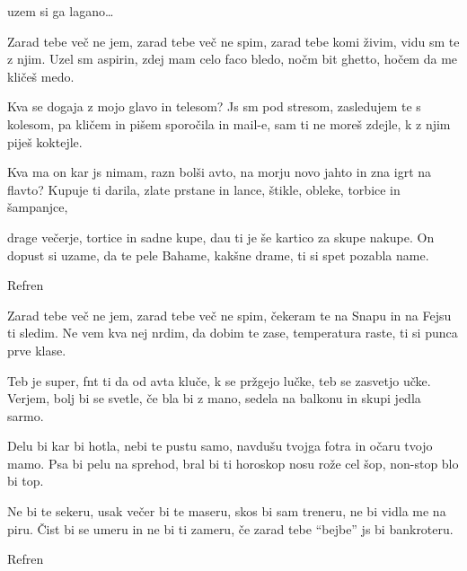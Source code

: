 uzem si ga lagano…
    \endchorus

    \beginverse\baselineskip=14.5pt
        Zarad tebe več ne jem, zarad tebe več ne spim,
        zarad tebe komi živim, vidu sm te z njim.
        Uzel sm aspirin, zdej mam celo faco bledo,
        nočm bit ghetto, hočem da me kličeš medo.
    \endverse

    \beginverse\baselineskip=14.5pt
        Kva se dogaja z mojo glavo in telesom?
        Js sm pod stresom, zasledujem te s kolesom,
        pa kličem in pišem sporočila in mail-e,
        sam ti ne moreš zdejle, k z njim piješ koktejle.
    \endverse

    \beginverse\baselineskip=14.5pt
        Kva ma on kar js nimam, razn bolši avto,
        na morju novo jahto in zna igrt na flavto?
        Kupuje ti darila, zlate prstane in lance,
        štikle, obleke, torbice in šampanjce,
    \endverse

    \beginverse\baselineskip=14.5pt
        drage večerje, tortice in sadne kupe,
        dau ti je še kartico za skupe nakupe.
        On dopust si uzame, da te pele Bahame,
        kakšne drame, ti si spet pozabla name.
    \endverse

    \beginchorus\baselineskip=12pt
        Refren
    \endchorus

    \beginverse\baselineskip=14.5pt
        Zarad tebe več ne jem, zarad tebe več ne spim,
        čekeram te na Snapu in na Fejsu ti sledim.
        Ne vem kva nej nrdim, da dobim te zase,
        temperatura raste, ti si punca prve klase.
    \endverse

    \beginverse\baselineskip=14.5pt
        Teb je super, fnt ti da od avta kluče,
        k se pržgejo lučke, teb se zasvetjo učke.
        Verjem, bolj bi se svetle, če bla bi z mano,
        sedela na balkonu in skupi jedla sarmo.
    \endverse

    \beginverse\baselineskip=14.5pt
        Delu bi kar bi hotla, nebi te pustu samo,
        navdušu tvojga fotra in očaru tvojo mamo.
        Psa bi pelu na sprehod, bral bi ti horoskop
        nosu rože cel šop, non-stop blo bi top.
    \endverse

    \beginverse\baselineskip=14.5pt
        Ne bi te sekeru, usak večer bi te maseru,
        skos bi sam treneru, ne bi vidla me na piru.
        Čist bi se umeru in ne bi ti zameru,
        če zarad tebe “bejbe” js bi bankroteru.
    \endverse

    \beginchorus\baselineskip=12pt
        Refren
    \]\]\]\]\]\]\]\]\]\]\]\]\]\]\]\]\]\]\]\]\]\]\]\]\]\]\]\]\]\]\]\]\]\]\]\]\]\]\]\]\]\]\]\]\]\]\]\]\]\]\]\]\]\]\]\]\]\]\]\]\]\]\]\]\]\]\]\]\]\]\]\]\]\]\]\]\]\]\]\]\]\]\]\]\]\]\]\]\]\]\]\]\]\]\]\]\]\]\]\]\]\]\]\]\]\]\]\]\]\]\]\]\]\]\]\]\]\]\]\]\]\]\]\]\]\]\]\]\]\]\]\]\]\]\]\]\]\]\]\]\]\]\]\]\]\]\]\]\]\]\]\]\]\]\]\]\]\]\]\]\]\]\]\]\]\]\]\]\]\]\]\]\]\]\]\]\]\]\]\]\]\]\]\]\]\]\]\]\]\]\]\]\]\]\]\]\]\]\]\]\]\]\]\]\]\]\]\]\]\]\]\]\]\]\]\]\]\]\]\]\]\]\]\]\]\]\]\]\]\]\]\]\]\]\]\]\]\]\]\]\]\]\]\]\]\]\]\]\]\]\]\]\]\]\]\]\]\]\]\]\]\]\]\]\]\]\]\]\]\]\]\]\]\]\]\]\]\]\]\]\]\]\]\]\]\]\]\]\]\]\]\]\]\]\]\]\]\]\]\]\]\]\]\]\]\]\]\]\]\]\]\]\]\]\]\]\]\]\]\]\]\]\]\]\]\]\]\]\]\]\]\]\]\]\]\]\]\]\]\]\]\]\]\]\]\]\]\]\]\]\]\]\]\]\]\]\]\]\]\]\]\]\]\]\]\]\]\]\]\]\]\]\]\]\]\]\]\]\]\]\]\]\]\]\]\]\]\]\]\]\]\]\]\]\]\]\]\]\]\]\]\]\]\]\]\]\]\]\]\]\]\]\]\]\]\]\]\]\]\]\]\]\]\]\]\]\]\]\]\]\]\]\]\]\]\]\]\]\]\]\]\]\]\]\]\]\]\]\]\]\]\]\]\]\]\]\]\]\]\]\]\]\]\]\]\]\]\]\]\]\]\]\]\]\]\]\]\]\]\]\]\]\]\]\]\]\]\]\]\]\]\]\]\]\]\]\]\]\]\]\]\]\]\]\]\]\]\]\]\]\]\]\]\]\]\]\]\]\]\]\]\]\]\]\]\]\]\]\]\]\]\]\]\]\]\]\]\]\]\]\]\]\]\]\]\]\]\]\]\]\]\]\]\]\]\]\]\]\]\]\]\]\]\]\]\]\]\]\]\]\]\]\]\]\]\]\]\]\]\]\]\]\]\]\]\]\]\]\]\]\]\]\]\]\]\]\]\]\]\]\]\]\]\]\]\]\]\]\]\]\]\]\]\]\]\]\]\]\]\]\]\]\]\]\]\]\]\]\]\]\]\]\]\]\]\]\]\]\]\]\]\]\]\]\]\]\]\]\]\]\]\]\]\]\]\]\]\]\]\]\]\]\]\]\]\]\]\]\]\]\]\]\]\]\]\]\]\]\]\]\]\]\]\]\]\]\]\]\]\]\]\]\]\]\]\]\]\]\]\]\]\]\]\]\]\]\]\]\]\]\]\]\]\]\]\]\]\]\]\]\]\]\]\]\]\]\]\]\]\]\]\]\]\]\]\]\]\]\]\]\]\]\]\]\]\]\]\]\]\]\]\]\]\]\]\]\]\]\]\]\]\]\]\]\]\]\]\]\]\]\]\]\]\]\]\]\]\]\]\]\]\]\]\]\]\]\]\]\]\]\]\]\]\]\]\]\]\]\]\]\]\]\]\]\]\]\]\]\]\]\]\]\]\]\]\]\]\]\]\]\]\]\]\]\]\]\]\]\]\]\]\]\]\]\]\]\]\]\]\]\]\]\]\]\]\]\]\]\]\]\]\]\]\]\]\]\]\]\]\]\]\]\]\]\]\]\]\]\]\]\]\]\]\]\]\]\]\]\]\]\]\]\]\]\]\]\]\]\]\]\]\]\]\]\]\]\]\]\]\]\]\]\]\]\]\]\]\]\]\]\]\]\]\]\]\]\]\]\]\]\]\]\]\]\]\]\]\]\]\]\]\]\]\]\]\]\]\]\]\]\]\]\]\]\]\]\]\]\]\]\]\]\]\]\]\]\]\]\]\]\]\]\]\]\]\]\]\]\]\]\]\]\]\]\]\]\]\]\]\]\]\]\]\]\]\]\]\]\]\]\]\]\]\]\]\]\]\]\]\]\]\]\]\]\]\]\]\]\]\]\]\]\]\]\]\]\]\]\]\]\]\]\]\]\]\]\]\]\]\]\]\]\]\]\]\]\]\]\]\]\]\]\]\]\]\]\]\]\]\]\]\]\]\]\]\]\]\]\]\]\]\]\]\]\]\]\]\]\]\]\]\]\]\]\]\]\]\]\]\]\]\]\]\]\]\]\]\]\]\]\]\]\]\]\]\]\]\]\]\]\]\]\]\]\]\]\]\]\]\]\]\]\]\]\]\]\]\]\]\]\]\]\]\]\]\]\]\]\]\]\]\]\]\]\]\]\]\]\]\]\]\]\]\]\]\]\]\]\]\]\]\]\]\]\]\]\]\]\]\]\]\]\]\]\]\]\]\]\]\]\]\]\]\]\]\]\]\]\]\]\]\]\]\]\]\]\]\]\]\]\]\]\]\]\]\]\]\]\]\]\]\]\]\]\]\]\]\]\]\]\]\]\]\]\]\]\]\]\]\]\]\]\]\]\]\]\]\]\]\]\]\]\]\]\]\]\]\]\]\]\]\]\]\]\]\]\]\]\]\]\]\]\]\]\]\]\]\]\]\]\]\]\]\]\]\]\]\]\]\]\]\]\]\]\]\]\]\]\]\]\]\]\]\]\]\]\]\]\]\]\]\]\]\]\]\]\]\]\]\]\]\]\]\]\]\]\]\]\]\]\]\]\]\]\]\]\]\]\]\]\]\]\]\]\]\]\]\]\]\]\]\]\]\]\]\]\]\]\]\]\]\]\]\]\]\]\]\]\]\]\]\]\]\]\]\]\]\]\]\]\]\]\]\]\]\]\]\]\]\]\]\]\]\]\]\]\]\]\]\]\]\]\]\]\]\]\]\]\]\]\]\]\]\]\]\]\]\]\]\]\]\]\]\]\]\]\]\]\]\]\]\]\]\]\]\]\]\]\]\]\]\]\]\]\]\]\]\]\]\]\]\]\]\]\]\]\]\]\]\]\]\]\]\]\]\]\]\]\]\]\]\]\]\]\]\]\]\]\]\]\]\]\]\]\]\]\]\]\]\]\]\]\]\]\]\]\]\]\]\]\]\]\]\]\]\]\]\]\]\]\]\]\]\]\]\]\]\]\]\]\]\]\]\]\]\]\]\]\]\]\]\]\]\]\]\]\]\]\]\]\]\]\]\]\]\]\]\]\]\]\]\]\]\]\]\]\]\]\]\]\]\]\]\]\]\]\]\]\]\]\]\]\]\]\]\]\]\]\]\]\]\]\]\]\]\]\]\]\]\]\]\]\]\]\]\]\]\]\]\]\]\]\]\]\]\]\]\]\]\]\]\]\]\]\]\]\]\]\]\]\]\]\]\]\]\]\]\]\]\]\]\]\]\]\]\]\]\]\]\]\]\]\]\]\]\]\]\]\]\]\]\]\]\]\]\]\]\]\]\]\]\]\]\]\]\]\]\]\]\]\]\]\]\]\]\]\]\]\]\]\]\]\]\]\]\]\]\]\]\]\]\]\]\]\]\]\]\]\]\]\]\]\]\]\]\]\]\]\]\]\]\]\]\]\]\]\]\]\]\]\]\]\]\]\]\]\]\]\]\]\]\]\]\]\]\]\]\]\]\]\]\]\]\]\]\]\]\]\]\]\]\]\]\]\]\]\]\]\]\]\]\]\]\]\]\]\]\]\]\]\]\]\]\]\]\]\]\]\]\]\]\]\]\]\]\]\]\]\]\]\]\]\]\]\]\]\]\]\]\]\]\]\]\]\]\]\]\]\]\]\]\]\]\]\]\]\]\]\]\]\]\]\]\]\]\]\]\]\]\]\]\]\]\]\]\]\]\]\]\]\]\]\]\]\]\]\]\]\]\]\]\]\]\]\]\]\]\]\]\]\]\]\]\]\]\]\]\]\]\]\]\]\]\]\]\]\]\]\]\]\]\]\]\]\]\]\]\]\]\]\]\]\]\]\]\]\]\]\]\]\]\]\]\]\]\]\]\]\]\]\]\]\]\]\]\]\]\]\]\]\]\]\]\]\]\]\]\]\]\]\]\]\]\]\]\]\]\]\]\]\]\]\]\]\]\]\]\]\]\]\]\]\]\]\]\]\]\]\]\]\]\]\]\]\]\]\]\]\]\]\]\]\]\]\]\]\]\]\]\]\]\]\]\]\]\]\]\]\]\]\]\]\]\]\]\]\]\]\]\]\]\]\]\]\]\]\]\]\]\]\]\]\]\]\]\]\]\]\]\]\]\]\]\]\]\]\]\]\]\]\]\]\]\]\]\]\]\]\]\]\]\]\]\]\]\]\]\]\]\]\]\]\]\]\]\]\]\]\]\]\]\]\]\]\]\]\]\]\]\]\]\]\]\]\]\]\]\]\]\]\]\]\]\]\]\]\]\]\]\]\]\]\]\]\]\]\]\]\]\]\]\]\]\]\]\]\]\]\]\]\]\]\]\]\]\]\]\]\]\]\]\]\]\]\]\]\]\]\]\]\]\]\]\]\]\]\]\]\]\]\]\]\]\]\]\]\]\]\]\]\]\]\]\]\]\]\]\]\]\]\]\]\]\]\]\]\]\]\]\]\]\]\]\]\]\]\]\]\]\]\]\]\]\]\]\]\]\]\]\]\]\]\]\]\]\]\]\]\]\]\]\]\]\]\]\]\]\]\]\]\]\]\]\]\]\]\]\]\]\]\]\]\]\]\]\]\]\]\]\]\]\]\]\]\]\]\]\]\]\]\]\]\]\]\]\]\]\]\]\]\]\]\]\]\]\]\]\]\]\]\]\]\]\]\]\]\]\]\]\]\]\]\]\]\]\]\]\]\]\]\]\]\]\]\]\]\]\]\]\]\]\]\]\]\]\]\]\]\]\]\]\]\]\]\]\]\]\]\]\]\]\]\]\]\]\]\]\]\]\]\]\]\]\]\]\]\]\]\]\]\]\]\]\]\]\]\]\]\]\]\]\]\]\]\]\]\]\]\]\]\]\]\]\]\]\]\]\]\]\]\]\]\]\]\]\]\]\]\]\]\]\]\]\]\]\]\]\]\]\]\]\]\]\]\]\]\]\]\]\]\]\]\]\]\]\]\]\]\]\]\]\]\]\]\]\]\]\]\]\]\]\]\]\]\]\]\]\]\]\]\]\]\]\]\]\]\]\]\]\]\]\]\]\]\]\]\]\]\]\]\]\]\]\]\]\]\]\]\]\]\]\]\]\]\]\]\]\]\]\]\]\]\]\]\]\]\]\]\]\]\]\]\]\]\]\]\]\]\]\]\]\]\]\]\]\]\]\]\]\]\]\]\]\]\]\]\]\]\]\]\]\]\]\]\]\]\]\]\]\]\]\]\]\]\]\]\]\]\]\]\]\]\]\]\]\]\]\]\]\]\]\]\]\]\]\]\]\]\]\]\]\]\]\]\]\]\]\]\]\]\]\]\]\]\]\]\]\]\]\]\]\]\]\]\]\]\]\]\]\]\]\]\]\]\]\]\]\]\]\]\]\]\]\]\]\]\]\]\]\]\]\]\]\]\]\]\]\]\]\]\]\]\]\]\]\]\]\]\]\]\]\]\]\]\]\]\]\]\]\]\]\]\]\]\]\]\]\]\]\]\]\]\]\]\]\]\]\]\]\]\]\]\]\]\]\]\]\]\]\]\]\]\]\]\]\]\]\]\]\]\]\]\]\]\]\]\]\]\]\]\]\]\]\]\]\]\]\]\]\]\]\]\]\]\]\]\]\]\]\]\]\]\]\]\]\]\]\]\]\]\]\]\]\]\]\]\]\]\]\]\]\]\]\]\]\]\]\]\]\]\]\]\]\]\]\]\]\]\]\]\]\]\]\]\]\]\]\]\]\]\]\]\]\]\]\]\]\]\]\]\]\]\]\]\]\]\]\]\]\]\]\]\]\]\]\]\]\]\]\]\]\]\]\]\]\]\]\]\]\]\]\]\]\]\]\]\]\]\]\]\]\]\]\]\]\]\]\]\]\]\]\]\]\]\]\]\]\]\]\]\]\]\]\]\]\]\]\]\]\]\]\]\]\]\]\]\]\]\]\]\]\]\]\]\]\]\]\]\]\]\]\]\]\]\]\]\]\]\]\]\]\]\]\]\]\]\]\]\]\]\]\]\]\]\]\]\]\]\]\]\]\]\]\]\]\]\]\]\]\]\]\]\]\]\]\]\]\]\]\]\]\]\]\]\]\]\]\]\]\]\]\]\]\]\]\]\]\]\]\]\]\]\]\]\]\]\]\]\]\]\]\]\]\]\]\]\]\]\]\]\]\]\]\]\]\]\]\]\]\]\]\]\]\]\]\]\]\]\]\]\]\]\]\]\]\]\]\]\]\]\]\]\]\]\]\]\]\]\]\]\]\]\]\]\]\]\]\]\]\]\]\]\]\]\]\]\]\]\]\]\]\]\]\]\]\]\]\]\]\]\]\]\]\]\]\]\]\]\]\]\]\]\]\]\]\]\]\]\]\]\]\]\]\]\]\]\]\]\]\]\]\]\]\]\]\]\]\]\]\]\]\]\]\]\]\]\]\]\]\]\]\]\]\]\]\]\]\]\]\]\]\]\]\]\]\]\]\]\]\]\]\]\]\]\]\]\]\]\]\]\]\]\]\]\]\]\]\]\]\]\]\]\]\]\]\]\]\]\]\]\]\]\]\]\]\]\]\]\]\]\]\]\]\]\]\]\]\]\]\]\]\]\]\]\]\]\]\]\]\]\]\]\]\]\]\]\]\]\]\]\]\]\]\]\]\]\]\]\]\]\]\]\]\]\]\]\]\]\]\]\]\]\]\]\]\]\]\]\]\]\]\]\]\]\]\]\]\]\]\]\]\]\]\]\]\]\]\]\]\]\]\]\]\]\]\]\]\]\]\]\]\]\]\]\]\]\]\]\]\]\]
